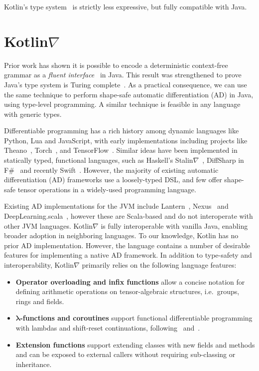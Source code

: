 \documentclass[12pt,initial,twoside,maitrise]{dms}
\numberwithin{equation}{section}
\numberwithin{table}{chapter}
\numberwithin{figure}{chapter}
\begin{document}
Kotlin's type system~\cite{tate2013mixed} is strictly less expressive, but fully compatible with Java.

\section{Kotlin$\nabla$}\label{sec:kotlingrad}

Prior work has shown it is possible to encode a deterministic context-free grammar as a \textit{fluent interface}~\cite{gil2016formal} in Java. This result was strengthened to prove Java's type system is Turing complete~\cite{Grigore:2017:JGT:3009837.3009871}. As a practical consequence, we can use the same technique to perform shape-safe automatic differentiation (AD) in Java, using type-level programming. A similar technique is feasible in any language with generic types.

Differentiable programming has a rich history among dynamic languages like Python, Lua and JavaScript, with early implementations including projects like Theano~\cite{DBLP:journals-corr-Al-RfouAAa16}, Torch~\cite{collobert2002torch}, and TensorFlow~\cite{abadi2016tensorflow}. Similar ideas have been implemented in statically typed, functional languages, such as Haskell's Stalin$\nabla$~\cite{pearlmutter2008using}, DiffSharp in F\#~\cite{baydin-diffsharp} and recently Swift~\cite{swift}. However, the majority of existing automatic differentiation (AD) frameworks use a loosely-typed DSL, and few offer shape-safe tensor operations in a widely-used programming language.

Existing AD implementations for the JVM include Lantern~\cite{DBLP:journals-corr-abs-1803-10228}, Nexus~\cite{chen2017typesafe} and DeepLearning.scala~\cite{dl4s}, however these are Scala-based and do not interoperate with other JVM languages. Kotlin$\nabla$ is fully interoperable with vanilla Java, enabling broader adoption in neighboring languages. To our knowledge, Kotlin has no prior AD implementation. However, the language contains a number of desirable features for implementing a native AD framework. In addition to type-safety and interoperability, Kotlin$\nabla$ primarily relies on the following language features:

\begin{itemize}
\item \textbf{Operator overloading and infix functions} allow a concise notation for defining arithmetic operations on tensor-algebraic structures, i.e.\ groups, rings and fields.
\item \textbf{$\mathbf{\lambda}$-functions and coroutines} support functional differentiable programming with lambdas and shift-reset continuations, following~\cite{pearlmutter2008reverse} and~\cite{DBLP:journals-corr-abs-1803-10228}.
\item \textbf{Extension functions} support extending classes with new fields and methods and can be exposed to external callers without requiring sub-classing or inheritance.
\end{itemize}
\end{document}

